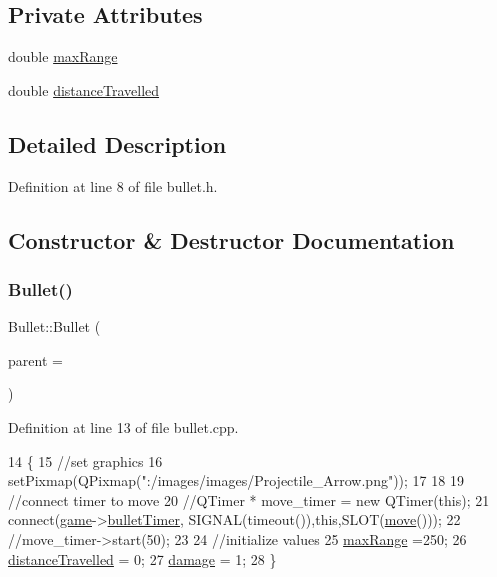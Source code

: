 \subsection*{Private Attributes}
\begin{DoxyCompactItemize}
\item 
double \hyperlink{class_bullet_ae7c4fadfcc22643cb271622fe8bb2eb0}{max\+Range}
\item 
double \hyperlink{class_bullet_afe194c1b7e495d0c17492396595202e1}{distance\+Travelled}
\end{DoxyCompactItemize}


\subsection{Detailed Description}


Definition at line 8 of file bullet.\+h.



\subsection{Constructor \& Destructor Documentation}
\mbox{\label{class_bullet_a3d9f64399991ef430df460cac893b731}} 
\subsubsection{\texorpdfstring{Bullet()}{Bullet()}}
{\footnotesize\ttfamily Bullet\+::\+Bullet (\begin{DoxyParamCaption}\item[{Q\+Graphics\+Item $\ast$}]{parent = {} }\end{DoxyParamCaption})}



Definition at line 13 of file bullet.\+cpp.


\begin{DoxyCode}
14 \{
15     \textcolor{comment}{//set graphics}
16     setPixmap(QPixmap(\textcolor{stringliteral}{":/images/images/Projectile\_Arrow.png"}));
17 
18 
19     \textcolor{comment}{//connect timer to move}
20     \textcolor{comment}{//QTimer * move\_timer = new QTimer(this);}
21     connect(\hyperlink{bullet_8cpp_a58bdb5643d0814ac4e697a1564b79b70}{game}->\hyperlink{class_game_a4774e6e02e372dabcba313802800df5d}{bulletTimer}, SIGNAL(timeout()),\textcolor{keyword}{this},SLOT(\hyperlink{class_bullet_a6140db968c42c05e829e142f74f20b16}{move}()));
22     \textcolor{comment}{//move\_timer->start(50);}
23 
24     \textcolor{comment}{//initialize values}
25     \hyperlink{class_bullet_ae7c4fadfcc22643cb271622fe8bb2eb0}{maxRange} =250;
26     \hyperlink{class_bullet_afe194c1b7e495d0c17492396595202e1}{distanceTravelled} = 0;
27     \hyperlink{class_bullet_a733d2ebbf9143c9ca68d3eb7e14121d0}{damage} = 1;
28 \}
\end{DoxyCode}


